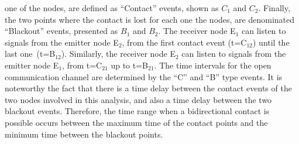 \documentclass[crop]{CSLB}
\newcommand{\cetis}{nodes}
\begin{document}
one of the \cetis{}, are defined as ``Contact'' events, shown as $C_1$
and $C_2$.
%
Finally, the two points where the contact is lost for each one the
\cetis{}, are denominated ``Blackout'' events, presented as $B_1$ and
$B_2$.
%
The receiver node E$_1$ can listen to signals from the emitter node
E$_2$, from the first contact event (t=C$_{12}$) until the last
one (t=B$_{12}$).
%
Similarly, the receiver node E$_2$ can listen to signals from the emitter
node E$_1$, from t=C$_{21}$ up to t=B$_{21}$.
%
The time intervals for the open communication channel are determined
by the ``C'' and ``B'' type events.
%
It is noteworthy the fact that there is a time delay between the
contact events of the two \cetis{} involved in this analysis, and also
a time delay between the two blackout events.
%
Therefore, the time range when a bidirectional contact is possible
occurs between the maximum time of the contact points and the minimum
time between the blackout points.
\end{document}
